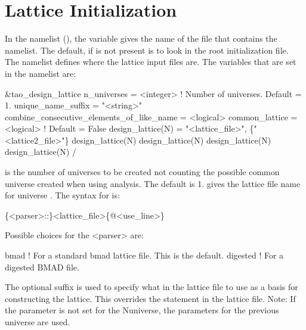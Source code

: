 \section{Lattice Initialization}
\label{s:init.lat} 

In the  namelist (), the  variable gives the name
of the file that contains the  namelist. The default, if  is
not present is to look in the \tao root initialization file. The  namelist
defines where the lattice input files are. The variables that are set in the 
namelist are:
\begin{example}
  &tao_design_lattice
    n_universes        = <integer>      ! Number of universes. Default = 1.
    unique_name_suffix = "<string>"
    combine_consecutive_elements_of_like_name = <logical>
    common_lattice = <logical>                        ! Default = False
    design_lattice(N) = "<lattice_file>", \{"<lattice2_file>"\}
    design_lattice(N)%
    design_lattice(N)%
    design_lattice(N)%
    design_lattice(N)%
  /
\end{example}

 is the number of universes to be created not counting the possible common universe
created when using  analysis. The default is 1.   gives the lattice
file name for universe .  The syntax for  is:
\begin{example}
  \{<parser>::\}<lattice_file>\{@<use_line>\}
\end{example}
Possible choices for the <parser> are:
\begin{example}
  bmad      ! For a standard bmad lattice file. This is the default.
  digested  ! For a digested BMAD file.
\end{example}
The  optional suffix is used to specify what  in the lattice file to use as
a basis for constructing the lattice. This overrides the  statement in the lattice file.
Note: If the  parameter is not set for the N\Th universe, the parameters for the 
previous universe are used.

